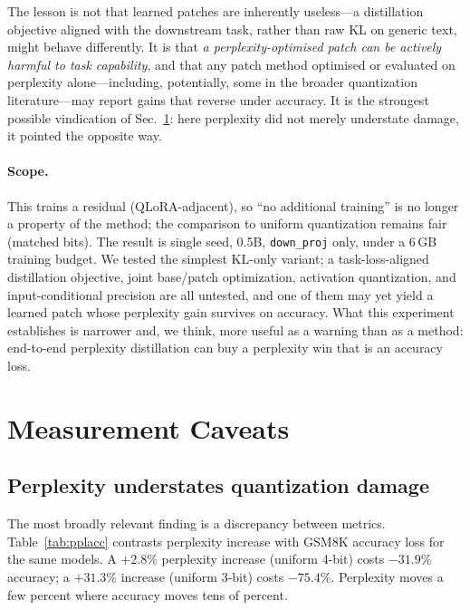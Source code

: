 \documentclass[manuscript, screen, review]{jair}
\newcommand{\code}[1]{\texttt{#1}}
\begin{document}
The lesson is not that learned patches are inherently useless---a
distillation objective aligned with the downstream task, rather than raw KL on
generic text, might behave differently. It is that \emph{a perplexity-optimised
patch can be actively harmful to task capability}, and that any patch method
optimised or evaluated on perplexity alone---including, potentially, some in
the broader quantization literature---may report gains that reverse under
accuracy. It is the strongest possible vindication of Sec.~\ref{sec:caveats}:
here perplexity did not merely understate damage, it pointed the opposite way.

\paragraph{Scope.} This trains a residual (QLoRA-adjacent), so ``no additional
training'' is no longer a property of the method; the comparison to uniform
quantization remains fair (matched bits). The result is single seed, 0.5B,
\code{down\_proj} only, under a 6\,GB training budget. We tested the simplest
KL-only variant; a task-loss-aligned distillation objective, joint base/patch
optimization, activation quantization, and input-conditional precision are all
untested, and one of them may yet yield a learned patch whose perplexity gain
survives on accuracy. What this experiment establishes is narrower and, we
think, more useful as a warning than as a method: end-to-end perplexity
distillation can buy a perplexity win that is an accuracy loss.

\section{Measurement Caveats}
\label{sec:caveats}

\subsection{Perplexity understates quantization damage}
The most broadly relevant finding is a discrepancy between metrics.
Table~\ref{tab:pplacc} contrasts perplexity increase with GSM8K accuracy loss
for the same models. A $+2.8\%$ perplexity increase (uniform 4-bit) costs
$-31.9\%$ accuracy; a $+31.3\%$ increase (uniform 3-bit) costs $-75.4\%$.
Perplexity moves a few percent where accuracy moves tens of percent.
\end{document}
